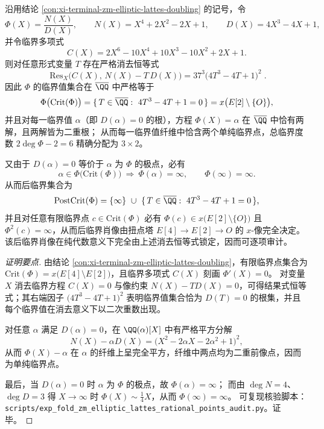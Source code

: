 \begin{conclusion}\label{con:xi-terminal-zm-elliptic-lattes-pcf-portrait}
沿用结论 \ref{con:xi-terminal-zm-elliptic-lattes-doubling} 的记号，令
\[
\Phi(X)=\frac{N(X)}{D(X)},\qquad
N(X)=X^{4}+2X^{2}-2X+1,\qquad
D(X)=4X^{3}-4X+1,
\]
并令临界多项式
\[
C(X)=2X^{6}-10X^{4}+10X^{3}-10X^{2}+2X+1.
\]
则对任意形式变量 \(T\) 存在严格消去恒等式
\[
\boxed{\;
\mathrm{Res}_{X}\!\bigl(C(X),\,N(X)-T\,D(X)\bigr)
=37^{3}\bigl(4T^{3}-4T+1\bigr)^{2}\; }.
\]
因此 \(\Phi\) 的临界值集合在 \(\overline{\QQ}\) 中严格等于
\[
\Phi\bigl(\mathrm{Crit}(\Phi)\bigr)
=\{\,T\in\overline{\QQ}:\ 4T^{3}-4T+1=0\,\}
=x\bigl(E[2]\setminus\{O\}\bigr),
\]
并且对每一临界值 \(\alpha\)（即 \(D(\alpha)=0\) 的根），方程 \(\Phi(X)=\alpha\) 在 \(\overline{\QQ}\) 中恰有两解，且两解皆为二重根；
从而每一临界值纤维中恰含两个单纯临界点，总临界度数 \(2\deg\Phi-2=6\) 精确分配为 \(3\times 2\)。
\par
又由于 \(D(\alpha)=0\) 等价于 \(\alpha\) 为 \(\Phi\) 的极点，必有
\[
\alpha\in \Phi\bigl(\mathrm{Crit}(\Phi)\bigr)\ \Longrightarrow\ \Phi(\alpha)=\infty,
\qquad
\Phi(\infty)=\infty.
\]
从而后临界集合为
\[
\mathrm{PostCrit}(\Phi)=\{\infty\}\ \cup\ \{\,T\in\overline{\QQ}:\ 4T^{3}-4T+1=0\,\},
\]
并且对任意有限临界点 \(c\in\mathrm{Crit}(\Phi)\) 必有 \(\Phi(c)\in x\bigl(E[2]\setminus\{O\}\bigr)\) 且 \(\Phi^{2}(c)=\infty\)，从而后临界肖像由扭点塔 \(E[4]\to E[2]\to O\) 的 \(x\)-像完全决定。
该后临界肖像在纯代数意义下完全由上述消去恒等式锁定，因而可逐项审计。
\end{conclusion}
\begin{proof}[证明要点]
由结论 \ref{con:xi-terminal-zm-elliptic-lattes-doubling}，有限临界点集合为
\(
\mathrm{Crit}(\Phi)=x\bigl(E[4]\setminus E[2]\bigr)
\)，且临界多项式 \(C(X)\) 刻画 \(\Phi'(X)=0\)。
对变量 \(X\) 消去临界方程 \(C(X)=0\) 与像约束 \(N(X)-T D(X)=0\)，可得结果式恒等式；其右端因子 \(\bigl(4T^{3}-4T+1\bigr)^{2}\) 表明临界值集合恰为 \(D(T)=0\) 的根集，并且每个临界值在消去意义下以二次重数出现。
\par
对任意 \(\alpha\) 满足 \(D(\alpha)=0\)，在 \(\QQ(\alpha)[X]\) 中有严格平方分解
\[
N(X)-\alpha D(X)=\bigl(X^{2}-2\alpha X-2\alpha^{2}+1\bigr)^{2},
\]
从而 \(\Phi(X)-\alpha\) 在 \(\alpha\) 的纤维上呈完全平方，纤维中两点均为二重前像点，因而为单纯临界点。
\par
最后，当 \(D(\alpha)=0\) 时 \(\alpha\) 为 \(\Phi\) 的极点，故 \(\Phi(\alpha)=\infty\)；
而由 \(\deg N=4\)、\(\deg D=3\) 得 \(X\to\infty\) 时 \(\Phi(X)\sim \tfrac14 X\)，从而 \(\Phi(\infty)=\infty\)。
可复现核验脚本：\texttt{scripts/exp\_fold\_zm\_elliptic\_lattes\_rational\_points\_audit.py}。证毕。
\end{proof}

